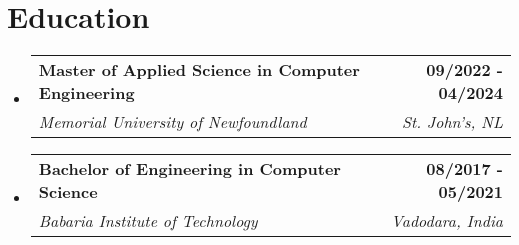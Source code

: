\documentclass[letterpaper,11pt]{article}
\makeatletter
\newcommand{\resumeItem}[1]{
  \item\small{
    {#1 \vspace{-2pt}}
  }
}
\newcommand{\resumeSubheading}[4]{
  \vspace{-2pt}\item
    \begin{tabular*}{1.0\textwidth}[t]{l@{\extracolsep{\fill}}r}
      \textbf{#1} & \textbf{\small #2} \\
      \textit{\small#3} & \textit{\small #4} \\
    \end{tabular*}\vspace{-7pt}
}
\newcommand{\resumeProjectHeading}[2]{
    \item
    \begin{tabular*}{1.001\textwidth}{l@{\extracolsep{\fill}}r}
      \small#1 & \textbf{\small #2}\\
    \end{tabular*}\vspace{-7pt}
}
\newcommand{\resumeSubHeadingListStart}{\begin{itemize}[leftmargin=0.0in, label={}]}
\newcommand{\resumeSubHeadingListEnd}{\end{itemize}}
\newcommand{\resumeItemListStart}{\begin{itemize}}
\newcommand{\resumeItemListEnd}{\end{itemize}\vspace{-5pt}}
\makeatother
\begin{document}
\section{Education}
\resumeSubHeadingListStart
\resumeSubheading
{Master of Applied Science in Computer Engineering}{09/2022 - 04/2024}
{Memorial University of Newfoundland}{St. John's, NL}
\resumeSubheading
{Bachelor of Engineering in Computer Science}{08/2017 - 05/2021}
{Babaria Institute of Technology}{Vadodara, India}
\resumeSubHeadingListEnd
\end{document}
